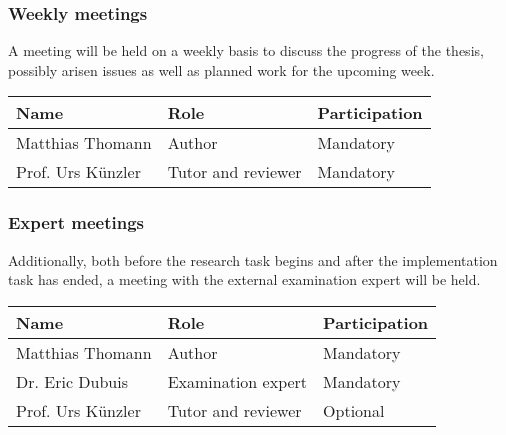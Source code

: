 \subsubsection{Weekly meetings}
A meeting will be held on a weekly basis to discuss the progress of the thesis, possibly arisen issues as well as planned work for the upcoming week.
\emptyline
\noindent\begin{tabular}{|l|l|l|}
    \hline
    \textbf{Name}       & \textbf{Role}         & \textbf{Participation}\\ \hline
    Matthias Thomann    & Author                & Mandatory             \\ \hline
    Prof. Urs Künzler   & Tutor and reviewer    & Mandatory             \\ \hline
\end{tabular}

\subsubsection{Expert meetings}
Additionally, both before the research task begins and after the implementation task has ended, a meeting with the external examination expert will be held.
\emptyline
\noindent\begin{tabular}{|l|l|l|}
    \hline
    \textbf{Name}       & \textbf{Role}         & \textbf{Participation}\\ \hline
    Matthias Thomann    & Author                & Mandatory             \\ \hline
    Dr. Eric Dubuis     & Examination expert    & Mandatory             \\ \hline
    Prof. Urs Künzler   & Tutor and reviewer    & Optional              \\ \hline
\end{tabular}
\emptyline


